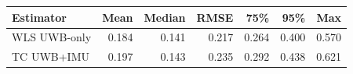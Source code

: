 \begin{tabular}{lrrrrrr}
\toprule
Estimator & Mean & Median & RMSE & 75\% & 95\% & Max \\
\midrule
WLS UWB-only & 0.184 & 0.141 & 0.217 & 0.264 & 0.400 & 0.570 \\
TC UWB+IMU & 0.197 & 0.143 & 0.235 & 0.292 & 0.438 & 0.621 \\
\bottomrule
\end{tabular}

